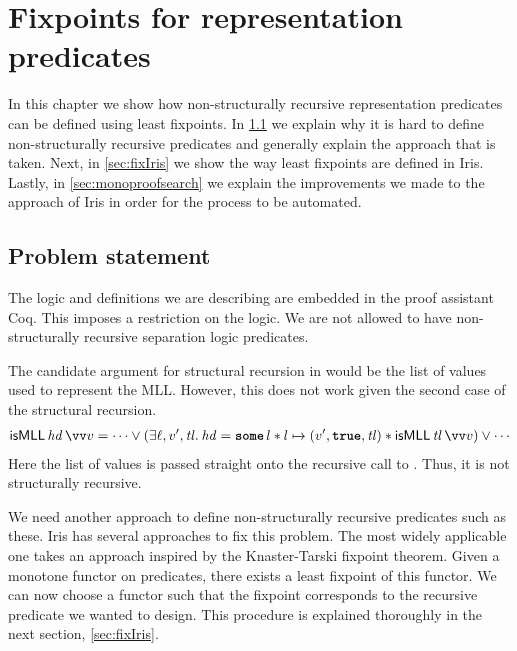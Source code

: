 \documentclass[thesis.tex]{subfiles}
\begin{document}
\chapter{Fixpoints for representation predicates}
\label{ch:fixpoints}
In this chapter we show how non-structurally recursive representation predicates can be defined using least fixpoints. In \cref*{sec:fixproblem} we explain why it is hard to define non-structurally recursive predicates and generally explain the approach that is taken. Next, in \cref*{sec:fixIris} we show the way least fixpoints are defined in Iris. Lastly, in \cref*{sec:monoproofsearch} we explain the improvements we made to the approach of Iris in order for the process to be automated.

\section{Problem statement}
\label{sec:fixproblem}
The logic and definitions we are describing are embedded in the proof assistant Coq. This imposes a restriction on the logic. We are not allowed to have non-structurally recursive separation logic predicates.

The candidate argument for structural recursion in \isMLL would be the list of values used to represent the MLL. However, this does not work given the second case of the structural recursion.
\begin{align*}
    \isMLL\,\hd\,\vect{\val} = \cdots \lor (\Exists \loc, \val', \tl. \hd = \Some l * l \fmapsto (\val', \True, \tl) * \isMLL\, \tl\, \vect{\val}) \lor \cdots
\end{align*}
Here the list of values is passed straight onto the recursive call to \isMLL. Thus, it is not structurally recursive.

We need another approach to define non-structurally recursive predicates such as these. Iris has several approaches to fix this problem. The most widely applicable one takes an approach inspired by the Knaster-Tarski fixpoint theorem\cite*{tarskiLatticetheoreticalFixpointTheorem1955}. Given a monotone functor on predicates, there exists a least fixpoint of this functor. We can now choose a functor such that the fixpoint corresponds to the recursive predicate we wanted to design. This procedure is explained thoroughly in the next section, \cref*{sec:fixIris}.
\end{document}
